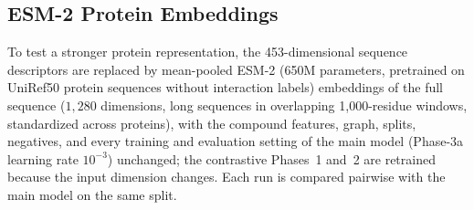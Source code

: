 \documentclass[11pt,letterpaper]{article}
\begin{document}
\begin{table}[!t]
\centering
\caption{External ROC-AUC / PR-AUC by maximum Tanimoto similarity to the training compounds, mean $\pm$ s.d. over 30 runs.}
\label{tab:similarity}
\small
{}
\end{table}

\subsection{ESM-2 Protein Embeddings}
\label{sec:esm}
To test a stronger protein representation, the 453-dimensional sequence descriptors are replaced by mean-pooled ESM-2 (650M parameters, pretrained on UniRef50 protein sequences without interaction labels) embeddings of the full sequence ($1{,}280$ dimensions, long sequences in overlapping 1{,}000-residue windows, standardized across proteins), with the compound features, graph, splits, negatives, and every training and evaluation setting of the main model (Phase-3a learning rate $10^{-3}$) unchanged; the contrastive Phases~1 and~2 are retrained because the input dimension changes. Each run is compared pairwise with the main model on the same split.
\end{document}
